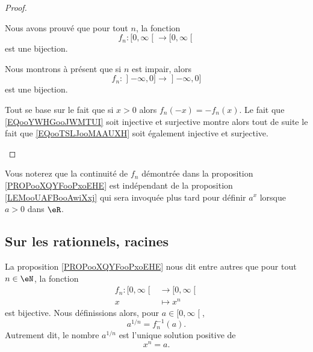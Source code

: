 \begin{proof}
\begin{subproof}
            Nous avons prouvé que pour tout \( n\), la fonction
            \begin{equation}        \label{EQooYWHGooJWMTUI}
                f_n\colon \mathopen[ 0 , \infty \mathclose[\to \mathopen[ 0 , \infty \mathclose[
            \end{equation}
            est une bijection.

        \item[Pour \( n\) impair]

            Nous montrons à présent que si \( n\) est impair, alors
            \begin{equation}        \label{EQooTSLJooMAAUXH}
                f_n\colon \mathopen] -\infty , 0 \mathclose]\to \mathopen] -\infty , 0 \mathclose]
            \end{equation}
            est une bijection.

            Tout se base sur le fait que si \( x>0\) alors \( f_n(-x)=-f_n(x)\). Le fait que \eqref{EQooYWHGooJWMTUI} soit injective et surjective montre alors tout de suite le fait que \eqref{EQooTSLJooMAAUXH} soit également injective et surjective.
    \end{subproof}
\end{proof}

Vous noterez que la continuité de \( f_n\) démontrée dans la proposition \ref{PROPooXQYFooPxoEHE} est indépendant de la proposition \ref{LEMooUAFBooAwiXxj} qui sera invoquée plus tard pour définir \( a^x\) lorsque \( a>0\) dans \( \eR\).

\subsection{Sur les rationnels, racines}

\begin{definition}        \label{DEFooJWQLooWkOBxQ}
    La proposition \ref{PROPooXQYFooPxoEHE} nous dit entre autres que pour tout \( n\in \eN\), la fonction
    \begin{equation}
        \begin{aligned}
            f_n\colon \mathopen[ 0 , \infty \mathclose[&\to \mathopen[ 0 , \infty \mathclose[ \\
            x&\mapsto x^n 
        \end{aligned}
    \end{equation}
    est bijective. Nous définissions alors, pour \( a\in \mathopen[ 0 , \infty \mathclose[\),
    \begin{equation}
        a^{1/n}=f_n^{-1}(a).
    \end{equation}
    Autrement dit, le nombre \( a^{1/n}\) est l'unique solution positive de
    \begin{equation}
        x^n=a.
    \end{equation}
\end{definition}

